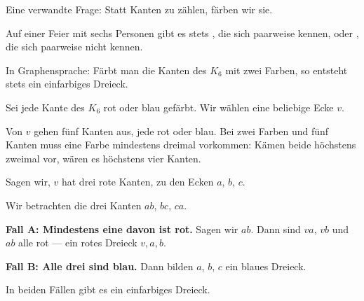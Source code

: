 Eine verwandte Frage: Statt Kanten zu zählen, färben wir sie.

\begin{merksatz}
\begin{center}
\begin{minipage}{0.9\textwidth}
Auf einer Feier mit sechs Personen gibt es stets , die sich paarweise kennen, oder , die sich paarweise nicht kennen.
\end{minipage}
\end{center}

In Graphensprache: Färbt man die Kanten des $K_6$ mit zwei Farben, so entsteht stets ein einfarbiges Dreieck.
\end{merksatz}

\begin{merksatz}
Sei jede Kante des $K_6$ rot oder blau gefärbt. Wir wählen eine beliebige Ecke $v$.

 Von $v$ gehen fünf Kanten aus, jede rot oder blau. Bei zwei Farben und fünf Kanten muss eine Farbe mindestens dreimal vorkommen: Kämen beide höchstens zweimal vor, wären es höchstens vier Kanten.

Sagen wir, $v$ hat drei rote Kanten, zu den Ecken $a$, $b$, $c$.

 Wir betrachten die drei Kanten $ab$, $bc$, $ca$.

\textbf{Fall A: Mindestens eine davon ist rot.} Sagen wir $ab$. Dann sind $va$, $vb$ und $ab$ alle rot --- ein rotes Dreieck $v, a, b$.

\textbf{Fall B: Alle drei sind blau.} Dann bilden $a$, $b$, $c$ ein blaues Dreieck.

In beiden Fällen gibt es ein einfarbiges Dreieck. \checkmark

\begin{center}
\end{center}


\end{merksatz}
